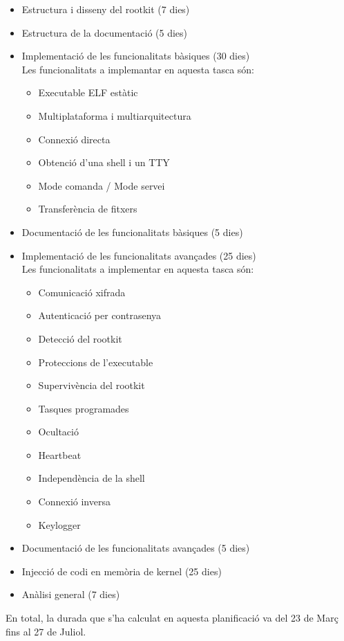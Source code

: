\begin{itemize}
    \item Estructura i disseny del rootkit (7 dies) 
    \item Estructura de la documentació (5 dies)
    \item Implementació de les funcionalitats bàsiques (30 dies) \\
		Les funcionalitats a implemantar en aquesta tasca són:
		\begin{itemize}
			\item Executable ELF estàtic
			\item Multiplataforma i multiarquitectura
			\item Connexió directa
			\item Obtenció d'una shell i un TTY
			\item Mode comanda / Mode servei
			\item Transferència de fitxers 
		\end{itemize}
    \item Documentació de les funcionalitats bàsiques (5 dies)
    \item Implementació de les funcionalitats avançades (25 dies) \\
		Les funcionalitats a implementar en aquesta tasca són:
		\begin{itemize}
			\item Comunicació xifrada
			\item Autenticació per contrasenya
			\item Detecció del rootkit
			\item Proteccions de l'executable
			\item Supervivència del rootkit
			\item Tasques programades
			\item Ocultació
			\item Heartbeat
			\item Independència de la shell
			\item Connexió inversa 
			\item Keylogger
		\end{itemize}
    \item Documentació de les funcionalitats avançades (5 dies)
    \item Injecció de codi en memòria de kernel (25 dies)
    \item Anàlisi general (7 dies) 
\end{itemize}
En total, la durada que s'ha calculat en aquesta planificació va del 23 de Març fins al 27 de Juliol. \\
